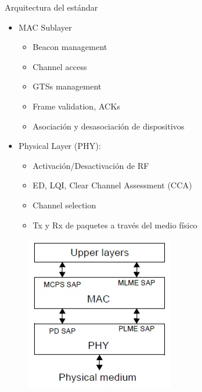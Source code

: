 \documentclass[aspectratio=169, handout]{beamer}
\begin{document}
\begin{frame}{Arquitectura del estándar}

\begin{minipage}[c]{1.0\linewidth}
	\begin{minipage}[c]{0.6\linewidth}
		\begin{itemize}
			\item MAC Sublayer
			\begin{itemize}
				\item Beacon management
				\item Channel access
				\item GTSs management
				\item Frame validation, ACKs
				\item Asociación y desasociación de dispositivos
			\end{itemize}
			\vspace{10px}
			\item Physical Layer (PHY):
			\begin{itemize}
				\item Activación/Desactivación de RF
				\item ED, LQI, Clear Channel Assessment (CCA)
				\item Channel selection
				\item Tx y Rx de paquetes a través del medio físico
			\end{itemize}
			\vspace{10px}
		\end{itemize}	
	  \end{minipage}
	  \begin{minipage}[c]{0.35\linewidth}
		\begin{figure}[H]
			{\includegraphics[width=.6\textwidth]{./imagenes/arquitectura}}
		\end{figure}	  	  	
	  \end{minipage}
\end{minipage}

\end{frame}
\end{document}
